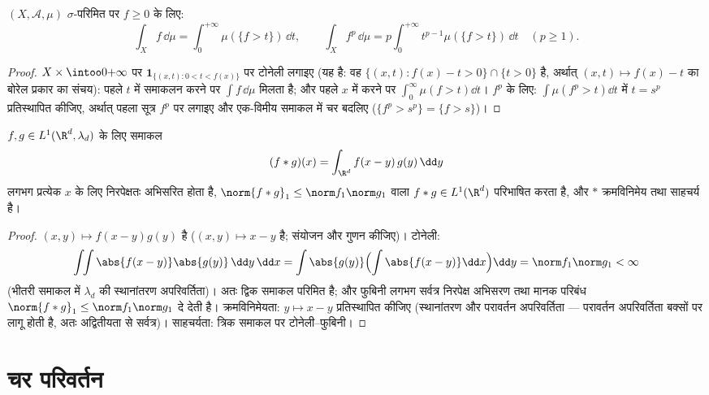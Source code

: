 \begin{proposition}[परत-केक]\label{prop:b3:product:layercake}
$(X, \mathcal A, \mu)$ $\sigma$-परिमित पर  $f \geq 0$ के लिए:
\[
\int_X f\,\dd\mu = \int_0^{+\infty}\mu(\{f > t\})\,\dd t,
\qquad
\int_X f^p\,\dd\mu = p\int_0^{+\infty}t^{p-1}\mu(\{f >
t\})\,\dd t \quad (p \geq 1).
\]
\end{proposition}

\begin{proof}
$X
\times \intoo0{+\infty}$ पर $\mathbf 1_{\{(x,t) : 0 < t < f(x)\}}$ पर टोनेली लगाइए (यह  है: वह $\{(x,t): f(x) - t
> 0\}\cap\{t > 0\}$ है, अर्थात्
 $(x,t)\mapsto f(x) - t$ का बोरेल प्रकार का संचय): पहले $t$ में समाकलन करने
पर $\int f\,\dd\mu$ मिलता है; और पहले $x$ में करने पर $\int_0^\infty\mu(f >
t)\dd t$। $f^p$ के लिए:
$\int\mu(f^p > t)
\dd t$ में $t = s^p$ प्रतिस्थापित कीजिए, अर्थात् पहला सूत्र $f^p$ पर
लगाइए और एक-विमीय समाकल में चर बदलिए ($\{f^p > s^p\} =
\{f > s\}$)।
\end{proof}

\begin{theorem}[$L^1$ पर संवलन]\label{thm:b3:product:convolution}
$f, g \in L^1(\R^d, \lambda_d)$ के लिए समाकल
\[
(f * g)(x) = \int_{\R^d} f(x - y)\,g(y)\,\dd y
\]
लगभग प्रत्येक $x$ के लिए निरपेक्षतः अभिसरित होता है, $\norm{f*g}_1 \leq \norm f_1\norm g_1$ वाला
$f * g \in
L^1(\R^d)$ परिभाषित करता है, और $*$ क्रमविनिमेय तथा साहचर्य
है।
\end{theorem}

\begin{proof}
$(x, y) \mapsto f(x-y)g(y)$  है ($(x,y)\mapsto x -
y$  है; संयोजन और गुणन कीजिए)। टोनेली:
\[
\int\!\!\int \abs{f(x-y)}\abs{g(y)}\,\dd y\,\dd x
= \int\abs{g(y)}\Bigl(\int\abs{f(x - y)}\dd x\Bigr)\dd y
= \norm f_1\norm g_1 < \infty
\]
(भीतरी समाकल में $\lambda_d$ की स्थानांतरण अपरिवर्तिता)। अतः द्विक
समाकल परिमित है; और फुबिनी लगभग सर्वत्र निरपेक्ष अभिसरण तथा मानक
परिबंध $\norm{f*g}_1 \leq \norm
f_1\norm g_1$ दे देती है। क्रमविनिमेयता: $y \mapsto x - y$ प्रतिस्थापित कीजिए
(स्थानांतरण और परावर्तन अपरिवर्तिता --- परावर्तन अपरिवर्तिता
बक्सों पर लागू होती है, अतः अद्वितीयता से सर्वत्र)। साहचर्यता:
त्रिक समाकल पर टोनेली--फुबिनी।
\end{proof}

\section{चर परिवर्तन}

